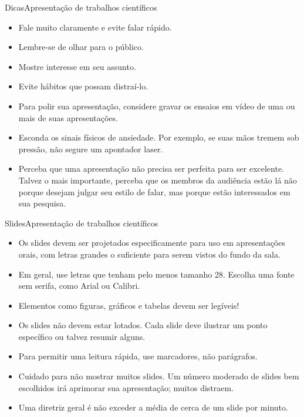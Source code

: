 \documentclass[t]{beamer}
\begin{document}

\begin{ftst}{Dicas}{Apresentação de trabalhos científicos}
\begin{itemize}
    \item Fale muito claramente e evite falar rápido.
    \item Lembre-se de olhar para o público. 
    \item Mostre interesse em seu assunto. 
    \item Evite hábitos que possam distraí-lo.
    \item Para polir sua apresentação, considere gravar os ensaios em vídeo de uma ou mais de suas apresentações. 
    \item Esconda os sinais físicos de ansiedade. Por exemplo, se suas mãos tremem sob pressão, não segure um apontador laser. 
    \item Perceba que uma apresentação não precisa ser perfeita para ser excelente. Talvez o mais importante, perceba que os membros da audiência estão lá não porque desejam julgar seu estilo de falar, mas porque estão interessados em sua pesquisa.
\end{itemize}
\end{ftst}


\begin{ftst}{Slides}{Apresentação de trabalhos científicos}
\begin{itemize}
    \item Os slides devem ser projetados especificamente para uso em apresentações orais, com letras grandes o suficiente para serem vistos do fundo da sala.
    \item Em geral, use letras que tenham pelo menos tamanho 28. Escolha uma fonte sem serifa, como Arial ou Calibri.
    \item Elementos como figuras, gráficos e tabelas devem ser legíveis!
    \item Os slides não devem estar lotados. Cada slide deve ilustrar um ponto específico ou talvez resumir alguns.
    \item Para permitir uma leitura rápida, use marcadores, não parágrafos.
    \item Cuidado para não mostrar muitos slides. Um número moderado de slides bem escolhidos irá aprimorar sua apresentação; muitos distraem. 
    \item Uma diretriz geral é não exceder a média de cerca de um slide por minuto.
\end{itemize}
\end{ftst}
\end{document}

